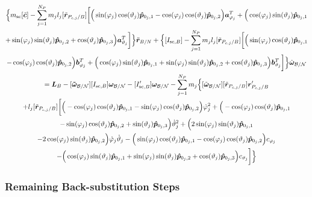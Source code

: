 \begin{multline}
	\Big\{m_{\text{sc}}[\tilde{\bm{c}}] - \sum\limits_{j=1}^{N_P}m_j l_j [\tilde{\bm{r}}_{P_{c,j}/B}] \bigg[
	\Big(\sin(\varphi_j)\cos(\vartheta_j)\bm{\hat{p}}_{0_j,1}-\cos(\varphi_j)\cos(\vartheta_j)\bm{\hat{p}}_{0_j,2}\Big)\bm a_{\varphi_j}^T
	+\Big(\cos(\varphi_j)\sin(\vartheta_j)\bm{\hat{p}}_{0_j,1}\\+\sin(\varphi_j)\sin(\vartheta_j)\bm{\hat{p}}_{0_j,2}+\cos(\vartheta_j)\bm{\hat{p}}_{0_j,3} \Big)\bm a_{\vartheta_j}^T
	\bigg]
	\Big\}\ddot{\bm r}_{B/N}
	+\Big\{[I_{\text{sc},B}] - \sum\limits_{j=1}^{N_P}m_j l_j [\tilde{\bm{r}}_{P_{c,j}/B}] \bigg[
	\Big(\sin(\varphi_j)\cos(\vartheta_j)\bm{\hat{p}}_{0_j,1}\\-\cos(\varphi_j)\cos(\vartheta_j)\bm{\hat{p}}_{0_j,2}\Big)\bm b_{\varphi_j}^T
	+\Big(\cos(\varphi_j)\sin(\vartheta_j)\bm{\hat{p}}_{0_j,1}
	+\sin(\varphi_j)\sin(\vartheta_j)\bm{\hat{p}}_{0_j,2}+\cos(\vartheta_j)\bm{\hat{p}}_{0_j,3} \Big)\bm b_{\vartheta_j}^T
	\bigg]
	\Big\}\dot{\bm\omega}_{\cal B/N}
	\\= 
	\bm{L}_B-[\bm{\tilde{\omega}}_{\cal B/N}] [I_{\text{sc},B}] \bm\omega_{\cal B/N}
	- [I'_{\text{sc},B}] \bm\omega_{\cal B/N}- \sum\limits_{j=1}^{N_P} m_j \Big\{[\tilde{\bm\omega}_{\cal B/N}] [\tilde{\bm{r}}_{P_{c,j}/B}] \bm{r}'_{P_{c,j}/B}
	\\+l_j[\tilde{\bm{r}}_{P_{c,j}/B}]\bigg[
	\Big(-\cos(\varphi_j)\cos(\vartheta_j)\bm{\hat{p}}_{0_j,1}-\sin(\varphi_j)\cos(\vartheta_j)\bm{\hat{p}}_{0_j,2}\Big)\dot{\varphi}_j^2
	+\Big(-\cos(\varphi_j)\cos(\vartheta_j)\bm{\hat{p}}_{0_j,1}\\-\sin(\varphi_j)\cos(\vartheta_j)\bm{\hat{p}}_{0_j,2}+\sin(\vartheta_j)\bm{\hat{p}}_{0_j,3} \Big)\dot{\vartheta}_j^2 +
	\Big(2\sin(\varphi_j)\sin(\vartheta_j)\bm{\hat{p}}_{0_j,1} \\-2\cos(\varphi_j)\sin(\vartheta_j)\bm{\hat{p}}_{0_j,2}\Big)\dot{\varphi}_j\dot{\vartheta}_j
	- \Big(\sin(\varphi_j)\cos(\vartheta_j)\bm{\hat{p}}_{0_j,1} -\cos(\varphi_j)\cos(\vartheta_j)\bm{\hat{p}}_{0_j,2}\Big)c_{\varphi_j} \\-   \Big(\cos(\varphi_j)\sin(\vartheta_j)\bm{\hat{p}}_{0_j,1}+\sin(\varphi_j)\sin(\vartheta_j)\bm{\hat{p}}_{0_j,2}+\cos(\vartheta_j)\bm{\hat{p}}_{0_j,3}\Big) c_{\vartheta_j}
	\bigg]\Big\}
	\label{eq:Final7}
\end{multline}

\subsubsection{Remaining Back-substitution Steps}

